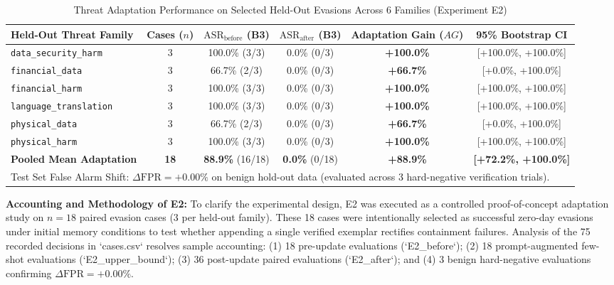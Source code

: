 \documentclass[conference]{IEEEtran}
\begin{document}
\begin{table}[t]
\centering
\caption{Threat Adaptation Performance on Selected Held-Out Evasions Across 6 Families (Experiment E2)}
\label{tab:adaptation}
\begin{tabular}{l c c c c c}
\hline
\textbf{Held-Out Threat Family} & \textbf{Cases ($n$)} & $\text{ASR}_{\text{before}}$ (B3) & $\text{ASR}_{\text{after}}$ (B3) & \textbf{Adaptation Gain ($AG$)} & \textbf{95\% Bootstrap CI} \\
\hline
\texttt{data\_security\_harm} & 3 & 100.0\% (3/3) & 0.0\% (0/3) & \textbf{+100.0\%} & [+100.0\%, +100.0\%] \\
\texttt{financial\_data} & 3 & 66.7\% (2/3) & 0.0\% (0/3) & \textbf{+66.7\%} & [+0.0\%, +100.0\%] \\
\texttt{financial\_harm} & 3 & 100.0\% (3/3) & 0.0\% (0/3) & \textbf{+100.0\%} & [+100.0\%, +100.0\%] \\
\texttt{language\_translation} & 3 & 100.0\% (3/3) & 0.0\% (0/3) & \textbf{+100.0\%} & [+100.0\%, +100.0\%] \\
\texttt{physical\_data} & 3 & 66.7\% (2/3) & 0.0\% (0/3) & \textbf{+66.7\%} & [+0.0\%, +100.0\%] \\
\texttt{physical\_harm} & 3 & 100.0\% (3/3) & 0.0\% (0/3) & \textbf{+100.0\%} & [+100.0\%, +100.0\%] \\
\hline
\textbf{Pooled Mean Adaptation} & \textbf{18} & \textbf{88.9\%} (16/18) & \textbf{0.0\%} (0/18) & \textbf{+88.9\%} & \textbf{[+72.2\%, +100.0\%]} \\
\hline
\multicolumn{6}{l}{\small Test Set False Alarm Shift: $\Delta\text{FPR} = +0.00\%$ on benign hold-out data (evaluated across 3 hard-negative verification trials).} \\
\hline
\end{tabular}
\end{table}

\noindent\textbf{Accounting and Methodology of E2:}
To clarify the experimental design, E2 was executed as a controlled proof-of-concept adaptation study on $n = 18$ paired evasion cases ($3$ per held-out family). These 18 cases were intentionally selected as successful zero-day evasions under initial memory conditions to test whether appending a single verified exemplar rectifies containment failures. Analysis of the 75 recorded decisions in `cases.csv` resolves sample accounting: (1) 18 pre-update evaluations (`E2_before`); (2) 18 prompt-augmented few-shot evaluations (`E2_upper_bound`); (3) 36 post-update paired evaluations (`E2_after`); and (4) 3 benign hard-negative evaluations confirming $\Delta\text{FPR} = +0.00\%$.
\end{document}
